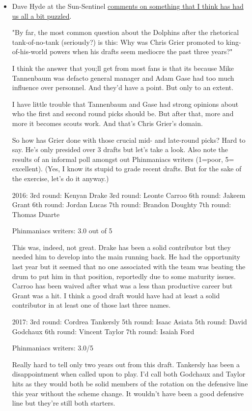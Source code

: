 \begin{itemize}
\item Dave Hyde at the Sun-Sentinel \href{https://www.sun-sentinel.com/sports/miami-dolphins/fl-sp-hyde-dolphins-grier-20190420-story.html}{comments on something that I think has had us all a bit puzzled}.

"By far, the most common question about the Dolphins after the rhetorical tank-of-no-tank (seriously?) is this: Why was Chris Grier promoted to king-of-his-world powers when his drafts seem mediocre the past three years?"

I think the answer that you;ll get from most fans is that its because Mike Tannenbaum was defacto general manager and Adam Gase had too much influence over personnel.  And they'd have a point.  But only to an extent.

I have little trouble that Tannenbaum and Gase had strong opinions about who the first and second round picks should be.  But after that, more and more it becomes scouts work.  And that's Chris Grier's domain.

So how has Grier done with those crucial mid- and late-round picks?  Hard to say.  He's only presided over 3 drafts but let's take a look.  Also note the results of an informal poll amongst out Phinmaniacs writers (1=poor, 5= excellent).  (Yes, I know its stupid to grade recent drafts.  But for the sake of the exercise, let's do it anyway.)

2016:
3rd round:  Kenyan Drake
3rd round:  Leonte Carroo
6th round:  Jakeem Grant
6th round:  Jordan Lucas
7th round:  Brandon Doughty
7th round:  Thomas Duarte

Phinmaniacs writers:  3.0 out of 5

This was, indeed, not great.  Drake has been a solid contributor but they needed him to develop into the main running back.  He had the opportunity last year but it seemed that no one associated with the team was beating the drum to put him in that position, reportedly due to some maturity issues.  Carroo has been waived after what was a less than productive career but Grant was a hit.  I think a good draft would have had at least a solid contributor in at least one of those last three names.

2017:
3rd round:  Cordrea Tankersly
5th round:  Isaac Asiata
5th round:  David Godchaux
6th round:  Vincent Taylor
7th round:  Isaiah Ford

Phinmaniacs writers:  3.0/5

Really hard to tell only two years out from this draft.  Tankersly has been a disappointment when called upon to play.  I'd call both Godchaux and Taylor hits as they would both be solid members of the rotation on the defensive line this year without the scheme change.  It wouldn't have been a good defensive line but they're still both starters.  


\end{itemize}
